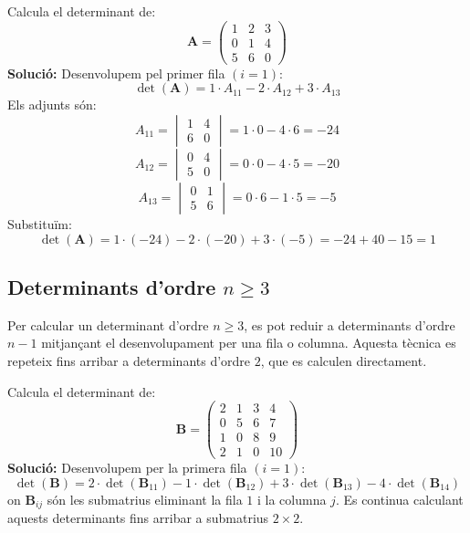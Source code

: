 \documentclass[12pt]{article}
\newcommand{\mat}[1]{\mathbf{#1}}
\begin{document}
\begin{exemple}
Calcula el determinant de:
\[
\mat{A} = \begin{pmatrix}
1 & 2 & 3 \\
0 & 1 & 4 \\
5 & 6 & 0
\end{pmatrix}
\]
\textbf{Solució:} Desenvolupem pel primer fila $(i = 1)$:
\[
\det(\mat{A}) = 1 \cdot A_{11} - 2 \cdot A_{12} + 3 \cdot A_{13}
\]
Els adjunts són:
\[
A_{11} = \begin{vmatrix}
1 & 4 \\
6 & 0
\end{vmatrix} = 1\cdot0 - 4\cdot6 = -24
\]
\[
A_{12} = \begin{vmatrix}
0 & 4 \\
5 & 0
\end{vmatrix} = 0\cdot0 - 4\cdot5 = -20
\]
\[
A_{13} = \begin{vmatrix}
0 & 1 \\
5 & 6
\end{vmatrix} = 0\cdot6 - 1\cdot5 = -5
\]
Substituïm:
\[
\det(\mat{A}) = 1\cdot(-24) - 2\cdot(-20) + 3\cdot(-5) = -24 + 40 - 15 = 1
\]
\end{exemple}

\subsection{\texorpdfstring{Determinants d'ordre $n \geq 3$}{Determinants d'ordre n geq 3}}
\begin{concept}
Per calcular un determinant d'ordre $n \geq 3$, es pot reduir a determinants d'ordre $n-1$ mitjançant el desenvolupament per una fila o columna. Aquesta tècnica es repeteix fins arribar a determinants d'ordre $2$, que es calculen directament.
\end{concept}

\begin{exemple}
Calcula el determinant de:
\[
\mat{B} = \begin{pmatrix}
2 & 1 & 3 & 4 \\
0 & 5 & 6 & 7 \\
1 & 0 & 8 & 9 \\
2 & 1 & 0 & 10
\end{pmatrix}
\]
\textbf{Solució:} Desenvolupem per la primera fila $(i=1)$:
\[
\det(\mat{B}) = 2 \cdot \det(\mat{B}_{11}) - 1 \cdot \det(\mat{B}_{12}) + 3 \cdot \det(\mat{B}_{13}) - 4 \cdot \det(\mat{B}_{14})
\]
on $\mat{B}_{ij}$ són les submatrius eliminant la fila $1$ i la columna $j$. Es continua calculant aquests determinants fins arribar a submatrius $2 \times 2$.
\end{exemple}
\end{document}
